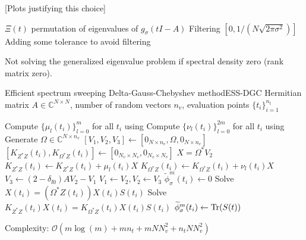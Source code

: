 [Plots justifying this choice]

$\Xi(t)$ permutation of eigenvalues of $g_{\sigma}(tI - A)$
Filtering $[0, 1 / (N \sqrt{2 \pi \sigma^2})]$ \cite{lin2017randomized}
Adding some tolerance to avoid filtering

Not solving the generalized eigenvalue problem if spectral density zero (rank matrix zero).

\begin{algo}{Efficient spectrum sweeping Delta-Gauss-Chebyshev method}{ESS-DGC}
    Hermitian matrix $A \in \mathbb{C}^{N \times N}$, number of random vectors $n_v$,
    evaluation points $\{t_i\}_{i=1}^{n_t}$
    \begin{algorithmic}[1]
        \State Compute $\{\mu_l(t_i)\}_{l=0}^m$ for all $t_i$ using 
        \State Compute $\{\nu_l(t_i)\}_{l=0}^{2m}$ for all $t_i$ using 
        \State Generate $\Omega \in \mathbb{C}^{N \times n_v}$
        \State $[V_1, V_2, V_3] \gets [0_{N \times n_v}, \Omega, 0_{N \times n_v}]$
        \State $[K_{Z^{\ast}Z}(t_i), K_{\Omega^{\ast}Z}(t_i)] \gets [0_{N_v \times N_v}, 0_{N_v \times N_v}]$
          \State $X = \Omega^{\ast} V_2$
              \State $K_{Z^{\ast}Z}(t_i) \gets K_{Z^{\ast}Z}(t_i) + \mu_l(t_i) X$
            \EndIf
            \State $K_{\Omega^{\ast}Z}(t_i) \gets K_{\Omega^{\ast}Z}(t_i) + \nu_l(t_i) X$
          \EndFor
          \State $V_3 \gets (2 - \delta_{l0}) A V_2 - V_1$ 
          \State $V_1 \gets V_2, V_2 \gets V_3$
        \EndFor
            \State $\widetilde{\phi}_{\sigma}^m(t_i) \gets 0$
          \Else
            \State Solve $ X(t_i) = (\Omega^{\ast} Z(t_i)) X(t_i) S(t_i)$
            \State Solve $K_{Z^{\ast}Z}(t_i) X(t_i) = K_{\Omega^{\ast}Z}(t_i) X(t_i) S(t_i)$
            \State $\widetilde{\phi}_{\sigma}^m(t_i) \gets \operatorname{Tr}(S(t))$
          \EndIf
        \EndFor
    \end{algorithmic}
\end{algo}

Complexity: $\mathcal{O}(m \log(m) + m n_t + m N N_v^2 + n_t N N_v^2)$


